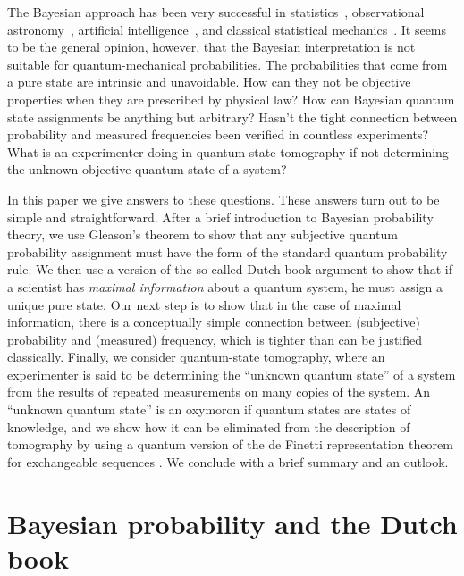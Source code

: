 \documentclass[aps,12pt]{revtex4}
\begin{document}
The Bayesian approach has been very successful in
statistics~\cite{Savage72,BernardoSmith,Science}, observational
astronomy~\cite{Loredo}, artificial intelligence~\cite{Microsoft},
and classical statistical mechanics~\cite{Jaynes83}. It seems to be
the general opinion, however, that the Bayesian interpretation is not
suitable for quantum-mechanical probabilities.  The probabilities
that come from a pure state are intrinsic and unavoidable.  How can
they not be objective properties when they are prescribed by physical
law?  How can Bayesian quantum state assignments be anything but
arbitrary?  Hasn't the tight connection between probability and
measured frequencies been verified in countless experiments?  What is
an experimenter doing in quantum-state tomography
\cite{Leonhardt,Buzek98} if not determining the unknown objective
quantum state of a system?

In this paper we give answers to these questions. These answers turn
out to be simple and straightforward. After a brief introduction to
Bayesian probability theory, we use Gleason's theorem
\cite{Gleason57} to show that any subjective quantum probability
assignment must have the form of the standard quantum probability
rule.  We then use a version of the so-called Dutch-book argument
\cite{DeFinettiBook,Earman} to show that if a scientist has {\it
maximal information\/} about a quantum system, he must assign a
unique pure state.  Our next step is to show that in the
case of maximal information, there is a conceptually simple
connection between (subjective) probability and (measured) frequency,
which is tighter than can be justified classically.  Finally, we
consider quantum-state tomography, where an experimenter is said to
be determining the ``unknown quantum state'' of a system from the
results of repeated measurements on many copies of the system.  An
``unknown quantum state'' is an oxymoron if quantum states are states
of knowledge, and we show how it can be eliminated from the
description of tomography by using a quantum version of the de
Finetti representation theorem for exchangeable sequences
\cite{Hudson76,Caves01}.  We conclude with a brief summary and an
outlook.

\section{Bayesian probability and the Dutch book}
\end{document}
